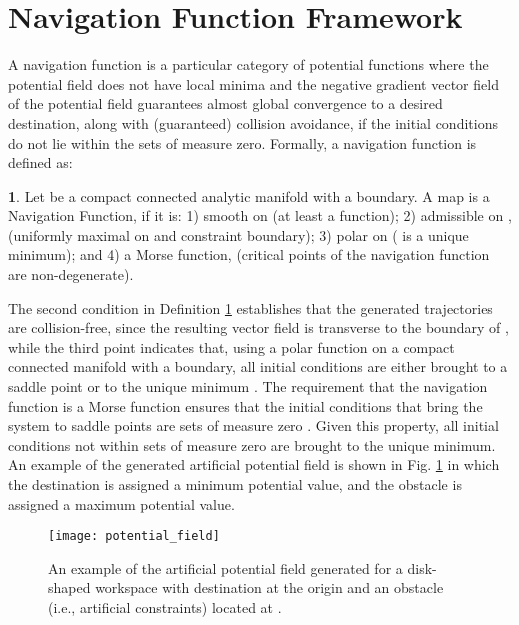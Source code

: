 \documentclass[english]{IOS-Book-Article}
\theoremstyle{definition}
\newtheorem{defn}{\protect\definitionname}
\theoremstyle{definition}
\providecommand{\definitionname}{Definition}
\begin{document}
\section{Navigation Function Framework }

A navigation function is a particular category of potential functions
where the potential field does not have local minima and the negative
gradient vector field of the potential field guarantees almost global
convergence to a desired destination, along with (guaranteed) collision
avoidance, if the initial conditions do not lie within the sets of
measure zero. Formally, a navigation function is defined as:
\begin{defn}
\label{Def1}\cite{Rimon1992} \cite{Rimon_1990}Let 
be a compact connected analytic manifold with a boundary. A map 
is a Navigation Function, if it is: 1) smooth on  (at
least a  function); 2) admissible on ,
(uniformly maximal on  and constraint boundary);
3) polar on  ( is a unique minimum); and 4)
a Morse function, (critical points of the navigation function are
non-degenerate).
\end{defn}
The second condition in Definition \ref{Def1} establishes that the
generated trajectories are collision-free, since the resulting vector
field is transverse to the boundary of , while the third
point indicates that, using a polar function on a compact connected
manifold with a boundary, all initial conditions are either brought
to a saddle point or to the unique minimum . The requirement
that the navigation function is a Morse function ensures that the
initial conditions that bring the system to saddle points are sets
of measure zero \cite{Rimon_1990}. Given this property, all initial
conditions not within sets of measure zero are brought to the unique
minimum. An example of the generated artificial potential field is
shown in Fig. \ref{fig:potential} in which the destination is assigned
a minimum potential value, and the obstacle is assigned a maximum
potential value.

\begin{figure}
\centering{}\texttt{[image: potential\_field]}

\caption{An example of the artificial potential field generated for a disk-shaped
workspace with destination at the origin and an obstacle (i.e., artificial
constraints) located at .}


\label{fig:potential}
\end{figure}
\end{document}
